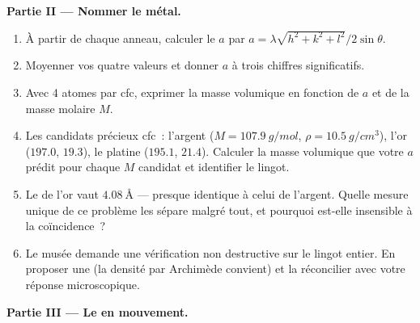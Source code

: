 \begin{problem}
\medskip\noindent\textbf{Partie II --- Nommer le métal.}

\begin{enumerate}[resume]
  \item À partir de chaque anneau, calculer le 
        $a$ par $a = \lambda\sqrt{h^2+k^2+l^2}/2\sin\theta$.
  \item Moyenner vos quatre valeurs et donner $a$ à trois chiffres
        significatifs.
  \item Avec 4 atomes par  cfc, exprimer la masse volumique en
        fonction de $a$ et de la masse molaire $M$.
  \item Les candidats précieux cfc~: l'argent
        ($M = \qty{107.9}{g/mol}$, $\rho = \qty{10.5}{g/cm^3}$),
        l'or ($197.0$, $19.3$), le platine ($195.1$, $21.4$).
        Calculer la masse volumique que votre $a$ prédit pour
        chaque $M$ candidat et identifier le lingot.
  \item Le  de l'or vaut
        $\qty{4.08}{\angstrom}$ --- presque identique à celui de
        l'argent. Quelle mesure unique de ce problème les sépare
        malgré tout, et pourquoi est-elle insensible à la
        coïncidence~?
  \item Le musée demande une vérification non destructive sur le
        lingot entier. En proposer une (la densité par Archimède
        convient) et la réconcilier avec votre réponse
        microscopique.
\end{enumerate}

\medskip\noindent\textbf{Partie III --- Le  en mouvement.}


\end{problem}
